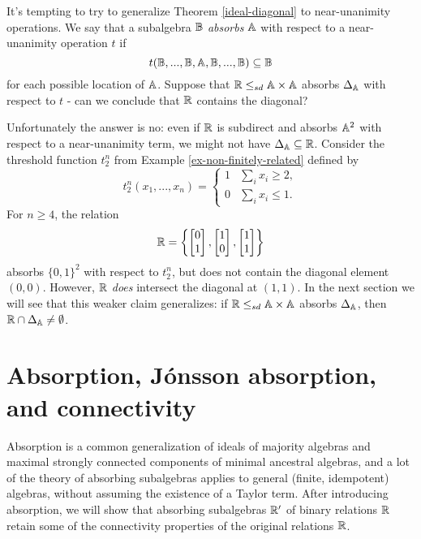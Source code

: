 \documentclass[letterpaper,11pt]{article}
\begin{document}
\begin{rem} It's tempting to try to generalize Theorem \ref{ideal-diagonal} to near-unanimity operations. We say that a subalgebra $\mathbb{B}$ \emph{absorbs} $\mathbb{A}$ with respect to a near-unanimity operation $t$ if
\[
t(\mathbb{B}, ..., \mathbb{B}, \mathbb{A}, \mathbb{B}, ..., \mathbb{B}) \subseteq \mathbb{B}
\]
for each possible location of $\mathbb{A}$. Suppose that $\mathbb{R} \le_{sd} \mathbb{A} \times \mathbb{A}$ absorbs $\Delta_{\mathbb{A}}$ with respect to $t$ - can we conclude that $\mathbb{R}$ contains the diagonal?

Unfortunately the answer is no: even if $\mathbb{R}$ is subdirect and absorbs $\mathbb{A}^2$ with respect to a near-unanimity term, we might not have $\Delta_{\mathbb{A}} \subseteq \mathbb{R}$. Consider the threshold function $t_2^n$ from Example \ref{ex-non-finitely-related} defined by
\[
t_2^n(x_1, ..., x_n) = \begin{cases} 1 & \sum_i x_i \ge 2,\\ 0 & \sum_i x_i \le 1.\end{cases}
\]
For $n \ge 4$, the relation
\[
\mathbb{R} = \left\{\begin{bmatrix}0 \\ 1\end{bmatrix}, \begin{bmatrix}1 \\ 0\end{bmatrix}, \begin{bmatrix}1 \\ 1\end{bmatrix}\right\}
\]
absorbs $\{0,1\}^2$ with respect to $t_2^n$, but does not contain the diagonal element $(0,0)$. However, $\mathbb{R}$ \emph{does} intersect the diagonal at $(1,1)$. In the next section we will see that this weaker claim generalizes: if $\mathbb{R} \le_{sd} \mathbb{A} \times \mathbb{A}$ absorbs $\Delta_{\mathbb{A}}$, then $\mathbb{R} \cap \Delta_{\mathbb{A}} \ne \emptyset$.
\end{rem}


\section{Absorption, J\'onsson absorption, and connectivity}

Absorption is a common generalization of ideals of majority algebras and maximal strongly connected components of minimal ancestral algebras, and a lot of the theory of absorbing subalgebras applies to general (finite, idempotent) algebras, without assuming the existence of a Taylor term. After introducing absorption, we will show that absorbing subalgebras $\mathbb{R}'$ of binary relations $\mathbb{R}$ retain some of the connectivity properties of the original relations $\mathbb{R}$.
\end{document}
